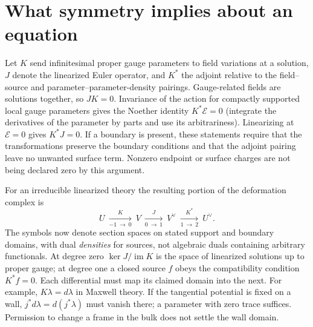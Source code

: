 \section{What symmetry implies about an equation}
Let $K$ send infinitesimal proper gauge parameters to field variations at a solution, $J$ denote the linearized Euler operator, and $K^*$ the adjoint relative to the field--source and parameter--parameter-density pairings. Gauge-related fields are solutions together, so $JK=0$. Invariance of the action for compactly supported local gauge parameters gives the Noether identity $K^*\mathcal E=0$ (integrate the derivatives of the parameter by parts and use its arbitrariness). Linearizing at $\mathcal E=0$ gives $K^*J=0$. If a boundary is present, these statements require that the transformations preserve the boundary conditions and that the adjoint pairing leave no unwanted surface term. Nonzero endpoint or surface charges are not being declared zero by this argument.

For an irreducible linearized theory the resulting portion of the deformation complex is
\begin{equation}
 U\ \xrightarrow[{-1\ \to\ 0}]{K}\ V\
 \xrightarrow[{0\ \to\ 1}]{J}\ V^\vee\
 \xrightarrow[{1\ \to\ 2}]{K^*}\ U^\vee .\label{f:deformation-complex}
\end{equation}
The symbols now denote section spaces on stated support and boundary domains, with dual \emph{densities} for sources, not algebraic duals containing arbitrary functionals. At degree zero $\ker J/\operatorname{im}K$ is the space of linearized solutions up to proper gauge; at degree one a closed source $f$ obeys the compatibility condition $K^*f=0$. Each differential must map its claimed domain into the next. For example, $K\lambda=d\lambda$ in Maxwell theory. If the tangential potential is fixed on a wall, $j^*d\lambda=d(j^*\lambda)$ must vanish there; a parameter with zero trace suffices. Permission to change a frame in the bulk does not settle the wall domain.

